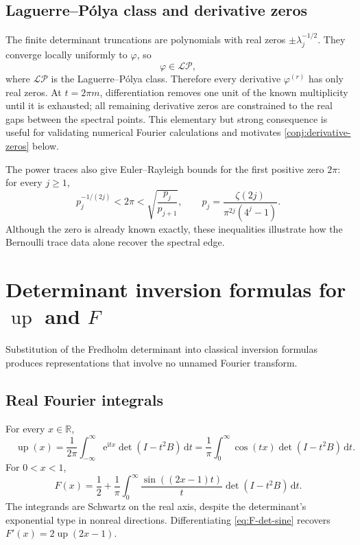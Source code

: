\documentclass[11pt,oneside]{article}
\theoremstyle{definition}
\newcommand{\dd}{\,\mathrm d}
\newcommand{\e}{\mathrm e}
\newcommand{\ii}{\mathrm i}
\newcommand{\R}{\mathbb R}
\newcommand{\Up}{\operatorname{up}}
\newcommand{\phiF}{\varphi}
\begin{document}
\subsection{Laguerre--P\'olya class and derivative zeros}

The finite determinant truncations are polynomials with real zeros
\(\pm\lambda_j^{-1/2}\).  They converge locally uniformly to \(\phiF\), so
\begin{equation}
 \phiF\in\mathcal{LP},
 \label{eq:phi-LP}
\end{equation}
where \(\mathcal{LP}\) is the Laguerre--P\'olya class.  Therefore every derivative
\(\phiF^{(r)}\) has only real zeros.  At \(t=2\pi m\), differentiation removes one
unit of the known multiplicity until it is exhausted; all remaining derivative zeros
are constrained to the real gaps between the spectral points.  This elementary but
strong consequence is useful for validating numerical Fourier calculations and
motivates \cref{conj:derivative-zeros} below.

The power traces also give Euler--Rayleigh bounds for the first positive zero
\(2\pi\): for every \(j\ge1\),
\begin{equation}
 p_j^{-1/(2j)}<2\pi<\sqrt{\frac{p_j}{p_{j+1}}},
 \qquad
 p_j=\frac{\zeta(2j)}{\pi^{2j}(4^j-1)}.
 \label{eq:Euler-Rayleigh}
\end{equation}
Although the zero is already known exactly, these inequalities illustrate how the
Bernoulli trace data alone recover the spectral edge.

\section{Determinant inversion formulas for \(\Up\) and \(F\)}
\label{sec:det-inversion}

Substitution of the Fredholm determinant into classical inversion formulas produces
representations that involve no unnamed Fourier transform.

\subsection{Real Fourier integrals}

For every \(x\in\R\),
\begin{equation}
 \boxed{\quad
 \Up(x)=\frac1{2\pi}\int_{-\infty}^{\infty}
 \e^{\ii tx}\det(I-t^2B)\dd t
 =\frac1\pi\int_0^\infty\cos(tx)\det(I-t^2B)\dd t.
 \quad}
 \label{eq:up-det-Fourier}
\end{equation}
For \(0<x<1\),
\begin{equation}
 \boxed{\quad
 F(x)=\frac12+\frac1\pi\int_0^\infty
 \frac{\sin((2x-1)t)}t\det(I-t^2B)\dd t.
 \quad}
 \label{eq:F-det-sine}
\end{equation}
The integrands are Schwartz on the real axis, despite the determinant's exponential
type in nonreal directions.  Differentiating \eqref{eq:F-det-sine} recovers
\(F'(x)=2\Up(2x-1)\).
\end{document}
